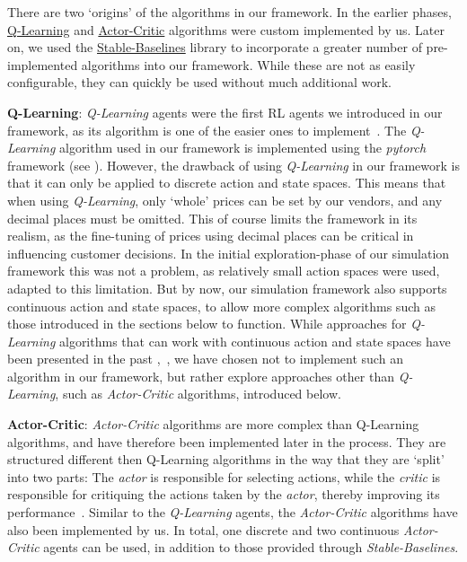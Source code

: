 There are two `origins' of the algorithms in our framework. In the earlier phases, \hyperref[item:QLearning]{Q-Learning} and \hyperref[item:ActorCritic]{Actor-Critic} algorithms were custom implemented by us. Later on, we used the \hyperref[item:StableBaselines]{Stable-Baselines} library to incorporate a greater number of pre-implemented algorithms into our framework. While these are not as easily configurable, they can quickly be used without much additional work.

\medskip
\noindent\textbf{Q-Learning}:\label{item:QLearning} \emph{Q-Learning} agents were the first RL agents we introduced in our framework, as its algorithm is one of the easier ones to implement~\cite{reinforcementLearningOverview}. The \emph{Q-Learning} algorithm used in our framework is implemented using the \emph{pytorch} framework (see \cite{Pytorch}). However, the drawback of using \emph{Q-Learning} in our framework is that it can only be applied to discrete action and state spaces. This means that when using \emph{Q-Learning}, only `whole' prices can be set by our vendors, and any decimal places must be omitted. This of course limits the framework in its realism, as the fine-tuning of prices using decimal places can be critical in influencing customer decisions. In the initial exploration-phase of our simulation framework this was not a problem, as relatively small action spaces were used, adapted to this limitation. But by now, our simulation framework also supports continuous action and state spaces, to allow more complex algorithms such as those introduced in the sections below to function. While approaches for \emph{Q-Learning} algorithms that can work with continuous action and state spaces have been presented in the past \cite{QLearningContinuous},~\cite{QLearningContinuous2}, we have chosen not to implement such an algorithm in our framework, but rather explore approaches other than \emph{Q-Learning}, such as \emph{Actor-Critic} algorithms, introduced below.

\clearpage
\noindent\textbf{Actor-Critic}:\label{item:ActorCritic} \emph{Actor-Critic} algorithms are more complex than Q-Learning algorithms, and have therefore been implemented later in the process. They are structured different then Q-Learning algorithms in the way that they are `split' into two parts: The \emph{actor} is responsible for selecting actions, while the \emph{critic} is responsible for critiquing  the actions taken by the \emph{actor}, thereby improving its performance~\cite{ActorCritic}. Similar to the \emph{Q-Learning} agents, the \emph{Actor-Critic} algorithms have also been implemented by us. In total, one discrete and two continuous \emph{Actor-Critic} agents can be used, in addition to those provided through \emph{Stable-Baselines}.

